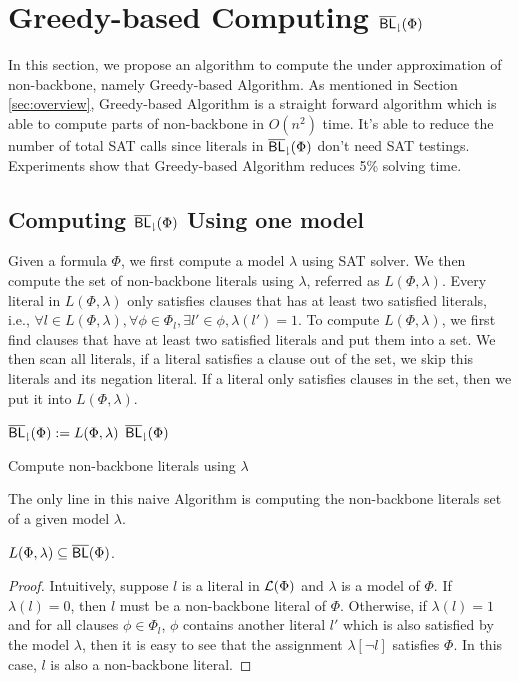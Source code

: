 \section{Greedy-based Computing ${\sf \overline{BL}_\downharpoonright}(\Phi)$} \label{sec:greedy}
In this section, we propose an algorithm to compute the under approximation of non-backbone, namely Greedy-based Algorithm. As mentioned in Section \ref{sec:overview}, Greedy-based Algorithm is a straight forward algorithm which is able to compute parts of non-backbone in $O(n^2)$ time. It's able to reduce the number of total SAT calls since literals in ${\sf \overline{BL}_\downharpoonright}(\Phi)$ don't need SAT testings. Experiments show that Greedy-based Algorithm reduces 5\% solving time.

\subsection{Computing ${\sf \overline{BL}_\downharpoonright}(\Phi)$ Using one model}

Given a formula $\Phi$, we first compute a model $\lambda$ using SAT solver. We then compute the set of non-backbone literals using $\lambda$, referred as $L(\Phi,\lambda)$. Every literal in $L(\Phi,\lambda)$ only satisfies clauses that has at least two satisfied literals, i.e., $\forall l\in L(\Phi,\lambda), \forall \phi\in\Phi_l, \exists l'\in\phi, \lambda(l')=1$.
To compute $L(\Phi,\lambda)$, we first find clauses that have at least two satisfied literals and put them into a set. We then scan all literals, if a literal satisfies a clause out of the set, we skip this literals and its negation literal. If a literal only satisfies clauses in the set, then we put it into $L(\Phi,\lambda)$.

\begin{algorithm2e}
\SetAlgoShortEnd
\SetFillComment
{}
${\sf \overline{BL}_\downharpoonright}(\Phi):=L(\Phi,\lambda)$\;
\Return ${\sf \overline{BL}_\downharpoonright}(\Phi)$\;
\caption{Compute non-backbone literals using $\lambda$}
\label{alg:greedy}
\end{algorithm2e}

The only line in this naive Algorithm is computing the non-backbone literals set of a given model $\lambda$.

\begin{theorem} \label{lem:navie}
 $L(\Phi,\lambda)\subseteq\overline{\textsf{BL}}(\Phi)$.
\end{theorem}

\begin{proof}
Intuitively, suppose $l$ is a literal in $\Lit(\Phi)$ and $\lambda$ is a model of $\Phi$.
If $\lambda(l)=0$, then $l$ must be a non-backbone literal of $\Phi$.
Otherwise, if $\lambda(l)=1$ and for all clauses $\phi\in\Phi_l$, $\phi$ contains another literal $l'$ which is also satisfied by the model $\lambda$, then it is easy to see that
the assignment $\lambda[\neg l]$ satisfies $\Phi$.
In this case, $l$ is also a non-backbone literal.
\end{proof}

